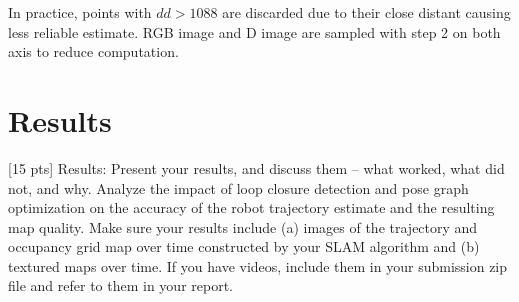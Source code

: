 \documentclass[conference]{IEEEtran}
\begin{document}
In practice, points with $dd > 1088$ are discarded due to 
their close distant causing less reliable estimate.
RGB image and D image are sampled with step 2 on both axis 
to reduce computation.


\section{Results}
[15 pts] Results: Present your results, and discuss them – what worked, what did not, and why.
Analyze the impact of loop closure detection and pose graph optimization on the accuracy of the robot
trajectory estimate and the resulting map quality. Make sure your results include (a) images of the
trajectory and occupancy grid map over time constructed by your SLAM algorithm and (b) textured
maps over time. If you have videos, include them in your submission zip file and refer to them in your
report.
\end{document}
